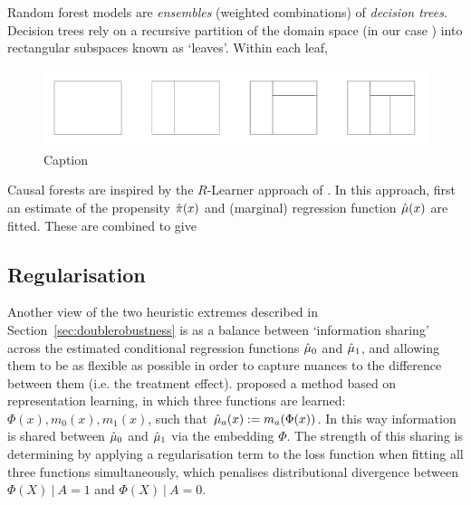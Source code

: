 \documentclass[../thesis.tex]{subfiles}
\begin{document}
Random forest models are \emph{ensembles} (weighted combinations) of \emph{decision trees}. Decision trees rely on a recursive partition of the domain space (in our case ) into rectangular subspaces known as `leaves'. Within each leaf, 

\begin{figure}
    \centering
    \includegraphics[width=\textwidth]{figures/chapter4/recursive.png}
    \caption{Caption}
    \label{fig:recursive}
\end{figure}

Causal forests are inspired by the $R$-Learner approach of \citet{nie_learning_2017}. In this approach, first an estimate of the propensity $\hat{\pi}(x)$ and (marginal) regression function $\hat{\mu}(x)$ are fitted. These are combined to give 




\citep{athey_generalized_2019} \citep{athey_estimating_2019}

\subsection{Regularisation} \label{sec:regularisation_hte}
Another view of the two heuristic extremes described in Section~\ref{sec:doublerobustness} is as a balance between  `information sharing' across the estimated conditional regression functions $\hat{\mu}_0$ and $\hat{\mu}_1$, and allowing them to be as flexible as possible in order to capture nuances to the difference between them (i.e. the treatment effect). \citet{shalit_estimating_2017} proposed a method based on representation learning, in which three functions are learned: $\Phi(x), m_0(x), m_1(x)$, such that $\hat{\mu}_a(x) := m_a(\Phi(x))$. In this way information is shared between $\hat{\mu}_0$ and $\hat{\mu}_1$ via the embedding $\Phi$. The strength of this sharing is determining by applying a regularisation term to the loss function when fitting all three functions simultaneously, which penalises distributional divergence between $\Phi(X) \ | \ A = 1$ and $\Phi(X)  \ | \ A = 0$. 
\end{document}
